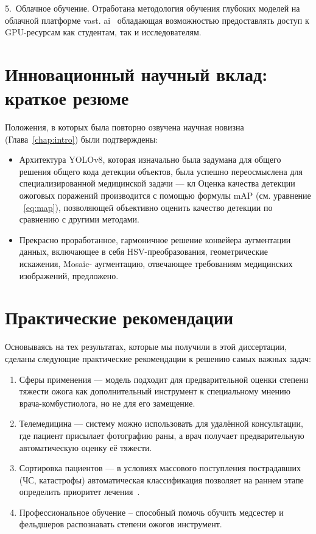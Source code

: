 5.~Облачное обучение. Отработана методология обучения глубоких моделей на облачной платформе vast. ai~\cite{vastai2023} обладающая возможностью предоставлять доступ к GPU-ресурсам как студентам, так и исследователям. \section{Инновационный научный вклад: краткое резюме}
Положения, в которых была повторно озвучена научная новизна (Глава~\ref{chap:intro}) были подтверждены:
\begin{itemize}
\item Архитектура YOLOv8, которая изначально была задумана для общего решения общего кода детекции объектов, была успешно переосмыслена для специализированной медицинской задачи --- кл Оценка качества детекции ожоговых поражений производится с помощью формулы mAP (см. уравнение ~\ref{eq:map}), позволяющей объективно оценить качество детекции по сравнению с другими методами. \item Прекрасно проработанное, гармоничное решение конвейера аугментации данных, включающее в себя HSV-преобразования, геометрические искажения, Mosaic- аугментацию, отвечающее требованиям медицинских изображений, предложено. \end{itemize}

\section{Практические рекомендации}

Основываясь на тех результатах, которые мы получили в этой диссертации, сделаны следующие практические рекомендации к решению самых важных задач:

\begin{enumerate}
\item Сферы применения --- модель подходит для предварительной оценки степени тяжести ожога как дополнительный инструмент к специальному мнению врача-комбустиолога, но не для его замещение.

\item Телемедицина --- систему можно использовать для удалённой консультации, где пациент присылает фотографию раны, а врач получает предварительную автоматическую оценку её тяжести. \item Сортировка пациентов --- в условиях массового поступления пострадавших (ЧС, катастрофы) автоматическая классификация позволяет на раннем этапе определить приоритет лечения~\cite{peck2012burns}. \item Профессиональное обучение -- способный помочь обучить медсестер и фельдшеров распознавать степени ожогов инструмент. \end{enumerate}

